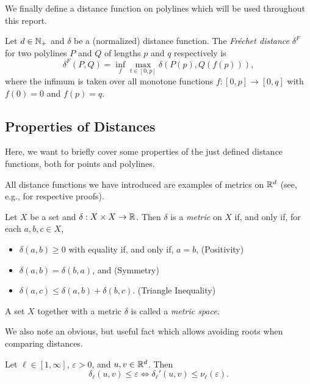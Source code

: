 We finally define a distance function on polylines which will be used throughout this report. 

\begin{definition}
  Let \(d \in \mathbb{N}_+\) and \(\delta\) be a (normalized) distance function. The \emph{Fréchet distance} \(\delta^F\) for two polylines \(P\) and \(Q\) of lengths \(p\) and \(q\) respectively is 
  \[\delta^F(P, Q) = \inf_f \max_{t \in [0, p]}\delta(P(p), Q(f(p))),\]
  where the infimum is taken over all monotone functions \(f:[0,p] \to [0, q]\) with \(f(0) = 0\) and \(f(p) = q\).
\end{definition}

\subsection{Properties of Distances}
Here, we want to briefly cover some properties of the just defined distance functions, both for points and polylines.

All distance functions we have introduced are examples of metrics on \(\mathbb{R}^d\) (see, e.g., \cite{metric_spaces} for respective proofs).

\begin{definition}\label{def:metric}
  Let \(X\) be a set and \(\delta:X\times X \to \mathbb{R}\). Then \(\delta\) is a \emph{metric} on \(X\) if, and only if, for each \(a, b, c \in X\), 
  \begin{itemize}
    \item \(\delta(a, b) \geq 0\) with equality if, and only if, \(a = b\), \hfill (Positivity)
    \item \(\delta(a, b) = \delta(b, a)\), and \hfill (Symmetry)
    \item \(\delta(a, c) \leq \delta(a, b) + \delta(b, c)\). \hfill (Triangle Inequality)
  \end{itemize}

  A set \(X\) together with a metric \(\delta\) is called a \emph{metric space}.
\end{definition}

We also note an obvious, but useful fact which allows avoiding roots when comparing distances. 
\begin{observation}\label{obs:unnormalize}
  Let \(\ell \in [1, \infty]\), \(\varepsilon > 0\), and \(u, v \in \mathbb{R}^d\). Then 
    \[\delta_\ell(u, v) \leq \varepsilon \iff \delta_\ell'(u, v) \leq \nu_\ell(\varepsilon).\]
\end{observation}


